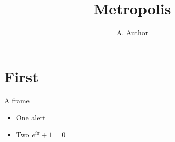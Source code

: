 \documentclass{beamer}
\title{Metropolis}
\author{A. Author}
\begin{document}
\maketitle
\section{First}
\begin{frame}{A frame}
  \begin{itemize}
    \item One \alert{alert}
    \item Two $e^{i\pi} + 1 = 0$
  \end{itemize}
\end{frame}
\end{document}
